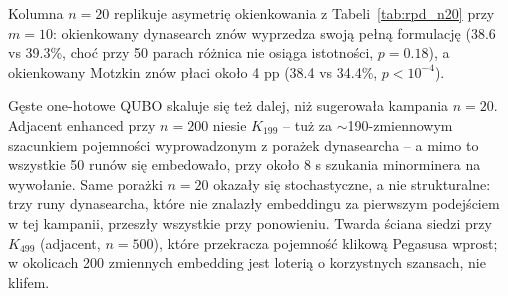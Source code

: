 \documentclass[11pt,a4paper]{article}
\begin{document}
Kolumna $n=20$ replikuje asymetrię okienkowania
z Tabeli~\ref{tab:rpd_n20} przy $m=10$: okienkowany dynasearch znów
wyprzedza swoją pełną formulację (38.6 vs 39.3\%, choć przy 50 parach
różnica nie osiąga istotności, $p=0.18$), a okienkowany Motzkin znów
płaci około 4 pp (38.4 vs 34.4\%, $p<10^{-4}$).

Gęste one-hotowe QUBO skaluje się też dalej, niż sugerowała kampania
$n=20$. Adjacent enhanced przy $n=200$ niesie $K_{199}$ -- tuż za
$\sim$190-zmiennowym szacunkiem pojemności wyprowadzonym z porażek
dynasearcha -- a mimo to wszystkie 50 runów się embedowało, przy
około 8 s szukania minorminera na wywołanie. Same porażki $n=20$
okazały się stochastyczne, a nie strukturalne: trzy runy dynasearcha,
które nie znalazły embeddingu za pierwszym podejściem w tej kampanii,
przeszły wszystkie przy ponowieniu. Twarda ściana siedzi przy
$K_{499}$ (adjacent, $n=500$), które przekracza pojemność klikową
Pegasusa wprost; w okolicach 200 zmiennych embedding jest loterią
o korzystnych szansach, nie klifem.
\end{document}

